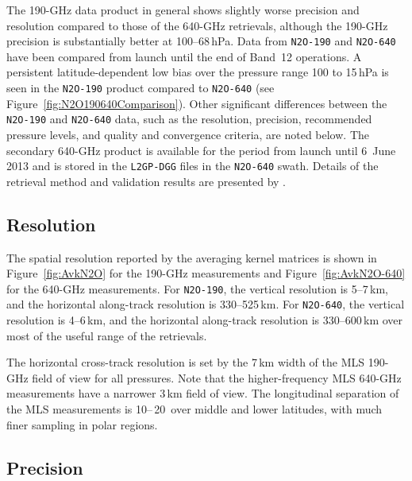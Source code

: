 The 190\nobreakdash-GHz  data product in general shows slightly worse precision and resolution compared to those of the 640\nobreakdash-GHz retrievals, although the 190\nobreakdash-GHz precision is substantially better at 100--68\,hPa. Data from \texttt{N2O-190} and \texttt{N2O-640} have been compared from launch until the end of Band~12 operations. A persistent latitude-dependent low bias over the pressure range 100 to 15\,hPa is seen in the \texttt{N2O-190} product compared to \texttt{N2O-640} (see Figure~\ref{fig:N2O190640Comparison}).  Other significant differences between the \thisv \texttt{N2O-190} and \texttt{N2O-640} data, such as the resolution, precision, recommended pressure levels, and quality and convergence criteria, are noted below. The secondary \thisv {} 640\nobreakdash-GHz product is available for the period from launch until 6~June 2013 and is stored in the \texttt{L2GP-DGG} files in the \texttt{N2O-640} swath. Details of the retrieval method and validation results are presented by \citet{LambertEtal:2007}.

\subsection{Resolution}



The spatial resolution reported by the averaging kernel matrices is shown in Figure~\ref{fig:AvkN2O} for the \mbox{190-GHz} measurements and Figure~\ref{fig:AvkN2O-640} for the \mbox{640-GHz} measurements. For \texttt{N2O-190}, the vertical resolution is 5--7\,km, and the horizontal along-track resolution is 330--525\,km. For \texttt{N2O-640}, the vertical resolution is 4--6\,km, and the horizontal along-track resolution is 330--600\,km over most of the useful range of the retrievals.

The horizontal cross-track resolution is set by the 7\,km width of the MLS 190\nobreakdash-GHz field of view for all pressures. Note that the higher-frequency MLS 640\nobreakdash-GHz measurements have a narrower 3\,km field of view. The longitudinal separation of the MLS measurements is 10\degsym--\,20\degsym\ over middle and lower latitudes, with much finer sampling in polar regions.

\subsection{Precision}

